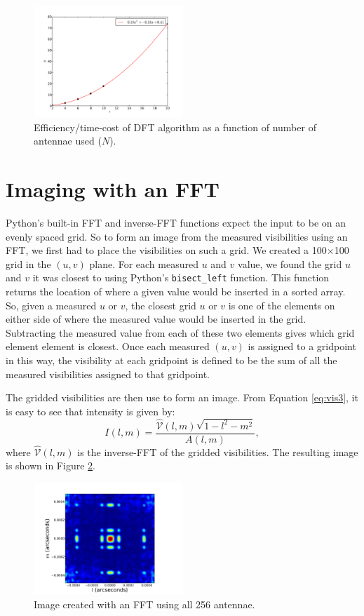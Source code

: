 \documentclass[11pt,letterpaper]{article}
\begin{document}
\begin{figure}[!h]

\centerline{
\includegraphics[width=0.5\textwidth]{DFT_image_timing.pdf}
}
\caption{Efficiency/time-cost of DFT algorithm as a function of number of antennae used ($N$).}
\label{fig:dft_timing}
\end{figure}
\section{Imaging with an FFT}
Python's built-in FFT and inverse-FFT functions expect the input 
to be on an evenly spaced grid.  So to form an image from the 
measured visibilities using an FFT, we first had to place the 
visibilities on such a grid.  We created a 100$\times$100 grid in 
the $(u,v)$ plane.  For each measured $u$ and $v$ value, we found the 
grid $u$ and $v$ it was closest to using Python's \texttt{bisect\_left} 
function.  This function returns the location of where a given value 
would be inserted in a sorted array.  So, given a measured $u$ or $v$, 
the closest grid $u$ or $v$ is one of the elements on either side of 
where the measured value would be inserted in the grid.  Subtracting the 
measured value from each of these two elements gives which grid element 
element is closest.  Once each measured $(u,v)$ is assigned to a 
gridpoint in this way, the visibility at each gridpoint is defined 
to be the sum of all the measured visibilities assigned to that gridpoint.

The gridded visibilities are then use to form an image.  From Equation 
\ref{eq:vis3}, it is easy to see that intensity is given by:
\begin{equation}
I(l,m)=\frac{\hat{\mathcal{V}}(l,m)\sqrt{1-l^2-m^2}}{A(l,m)},
\end{equation}
where $\hat{\mathcal{V}}(l,m)$ is the inverse-FFT of the gridded 
visibilities.  The resulting image is shown in Figure \ref{fig:fft}.

\begin{figure}[!h]
\centering
\includegraphics[width=0.5\textwidth]{FFT_Image.pdf}
\caption{Image created with an FFT using all 256 antennae.}
\label{fig:fft}
\end{figure}
\end{document}
